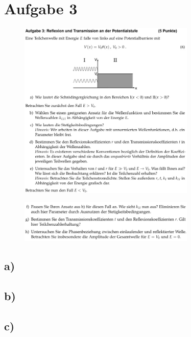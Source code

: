 \section{Aufgabe 3}

\begin{figure}[H]
    \centering
    \includegraphics[width=0.75\textwidth]{./images/Aufgabe3a_e.jpg}
    \label{fig:4}
\end{figure}

\begin{figure}[H]
    \centering
    \includegraphics[width=0.75\textwidth]{./images/Aufgabe3f_h.jpg}
    \label{fig:5}
\end{figure}

\subsection{a)}



\subsection{b)}



\subsection{c)}



